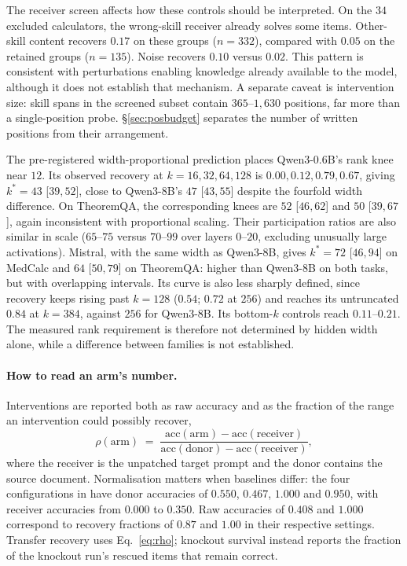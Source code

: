 The receiver screen affects how these controls should be interpreted. On the
$34$ excluded calculators, the wrong-skill receiver already solves some items.
Other-skill content recovers $0.17$ on these groups ($n=332$), compared with
$0.05$ on the retained groups ($n=135$). Noise recovers $0.10$ versus $0.02$.
This pattern is consistent with perturbations enabling knowledge already
available to the model, although it does not establish that mechanism.
A separate caveat is intervention size: skill spans in the screened subset
contain $365$--$1{,}630$ positions, far more than a single-position probe.
\S\ref{sec:posbudget} separates the number of written positions from their
arrangement.


The pre-registered width-proportional prediction places Qwen3-0.6B's rank
knee near $12$. Its observed recovery at $k=16,32,64,128$ is
$0.00,0.12,0.79,0.67$, giving $k^{*}=43$ [$39,52$], close to Qwen3-8B's
$47$ [$43,55$] despite the fourfold width difference. On TheoremQA, the
corresponding knees are $52$ [$46,62$] and $50$ [$39,67$], again inconsistent
with proportional scaling. Their participation ratios are also similar in
scale ($65$--$75$ versus $70$--$99$ over layers $0$--$20$, excluding unusually
large activations). Mistral, with the same width as Qwen3-8B, gives
$k^{*}=72$ [$46,94$] on MedCalc and $64$ [$50,79$] on TheoremQA: higher than
Qwen3-8B on both tasks, but with overlapping intervals. Its curve is also less
sharply defined, since recovery keeps rising past $k=128$ ($0.54$; $0.72$ at
$256$) and reaches its untruncated $0.84$ at $k=384$, against $256$ for
Qwen3-8B. Its bottom-$k$ controls reach
$0.11$--$0.21$. The measured rank requirement is therefore not determined by
hidden width alone, while a difference between families is not established.

\paragraph{How to read an arm's number.} Interventions are reported both as raw
accuracy and as the fraction of the range an intervention could possibly
recover,
\begin{equation}
\rho(\text{arm}) \;=\;
\frac{\text{acc}(\text{arm}) - \text{acc}(\text{receiver})}
     {\text{acc}(\text{donor}) - \text{acc}(\text{receiver})},
\end{equation}
where the receiver is the unpatched target prompt and the donor contains the
source document. Normalisation matters when baselines differ: the four
configurations in  have
donor accuracies of $0.550$, $0.467$, $1.000$ and $0.950$, with receiver
accuracies from $0.000$ to $0.350$. Raw accuracies of $0.408$ and $1.000$
correspond to recovery fractions of $0.87$ and $1.00$ in their respective
settings. Transfer recovery uses Eq.~\ref{eq:rho}; knockout survival instead
reports the fraction of the knockout run's rescued items that remain correct.

